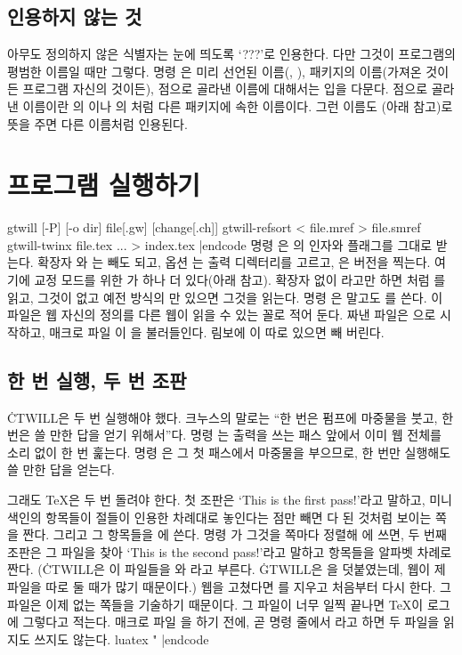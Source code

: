 \section{인용하지 않는 것}
아무도 정의하지 않은 식별자는 눈에 띄도록 `???'로 인용한다. 다만 그것이 프로그램의
평범한 이름일 때만 그렇다. 명령 은 미리 선언된 이름(,
), 패키지의 이름(가져온 것이든 프로그램 자신의 것이든), 점으로 골라낸
이름에 대해서는 입을 다문다. 점으로 골라낸 이름이란 의
이나 의 처럼 다른 패키지에 속한 이름이다. 그런
이름도 (아래 참고)로 뜻을 주면 다른 이름처럼 인용된다.

\chapter{프로그램 실행하기}
\begincode
gtwill [-P] [-o dir] file[.gw] [change[.ch]]
gtwill-refsort < file.mref > file.smref
gtwill-twinx file.tex ... > index.tex
|endcode
명령 은 의 인자와 플래그를 그대로 받는다. 확장자
와 는 빼도 되고, 옵션 는 출력 디렉터리를 고르고,
은 버전을 찍는다. 여기에 교정 모드를 위한 가 하나 더 있다(아래
참고). 확장자 없이 라고만 하면 처럼 를 읽고, 그것이
없고 예전 방식의 만 있으면 그것을 읽는다. 명령 은  말고도 를 쓴다. 이 파일은 웹
자신의 정의를 다른 웹이 읽을 수 있는 꼴로 적어 둔다. 짜낸 파일은 으로 시작하고, 매크로 파일 이 을 불러들인다.
림보에 이 따로 있으면 빼 버린다.

\section{한 번 실행, 두 번 조판}
\.{CTWILL}은 두 번 실행해야 했다. 크누스의 말로는 ``한 번은 펌프에 마중물을 붓고,
한 번은 쓸 만한 답을 얻기 위해서''다. 명령 는 출력을 쓰는 패스 앞에서
이미 웹 전체를 소리 없이 한 번 훑는다. 명령 은 그 첫 패스에서 마중물을
부으므로, 한 번만 실행해도 쓸 만한 답을 얻는다.

그래도 \TeX{}은 두 번 돌려야 한다. 첫 조판은 `This is the first pass!'라고 말하고,
미니 색인의 항목들이 절들이 인용한 차례대로 놓인다는 점만 빼면 다 된 것처럼 보이는
쪽을 짠다. 그리고 그 항목들을 에 쓴다. 명령 가
그것을 쪽마다 정렬해 에 쓰면, 두 번째 조판은 그 파일을 찾아
`This is the second pass!'라고 말하고 항목들을 알파벳 차례로 짠다. (\.{CTWILL}은
이 파일들을 와 라고 부른다. \.{GTWILL}은 을 덧붙였는데,
웹이 제  파일을 따로 둘 때가 많기 때문이다.) 웹을 고쳤다면
를 지우고 처음부터 다시 한다. 그 파일은 이제 없는 쪽들을 기술하기
때문이다. 그 파일이 너무 일찍 끝나면 \TeX{}이 로그에 그렇다고 적는다. 매크로 파일
을 하기 전에, 곧 명령 줄에서
라고 하면 두 파일을 읽지도 쓰지도 않는다.
\begincode
luatex "\let\norefs=\relax 
|endcode

